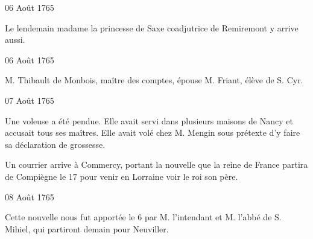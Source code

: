                      \begin{diary}{06 Août 1765}{}
                        
                         Le lendemain madame la princesse de Saxe
                           coadjutrice de Remiremont y arrive aussi. \bigskip
        
        
                     \end{diary}
                     
                     \begin{diary}{06 Août 1765}{}
                        
                        
                           M. Thibault de Monbois, maître des comptes,
                           épouse M. Friant, élève de S. Cyr. \bigskip
        
        
                     \end{diary}

                     \begin{diary}{07 Août 1765}{}
                        
                         Une voleuse a été pendue. Elle
                           avait servi
                           dans plusieurs maisons de Nancy
                           et accusait
                           tous ses maîtres. Elle avait volé chez
                           M. Mengin
                           sous prétexte d'y faire sa déclaration de grossesse. \bigskip
        
        
                         Un courrier arrive à Commercy, portant
                           la nouvelle que la reine
                              de France partira
                           de Compiègne
                           le 17 pour venir en Lorraine
                           voir le roi son père.
                        \bigskip
        
        
                     \end{diary}

                     \begin{diary}{08 Août 1765}{}
                        
                         Cette nouvelle nous fut apportée le 6
                           par M. l'intendant et
                              M. l'abbé de S.
                              Mihiel, qui partiront demain pour Neuviller. \bigskip
        
        
                     \end{diary}

